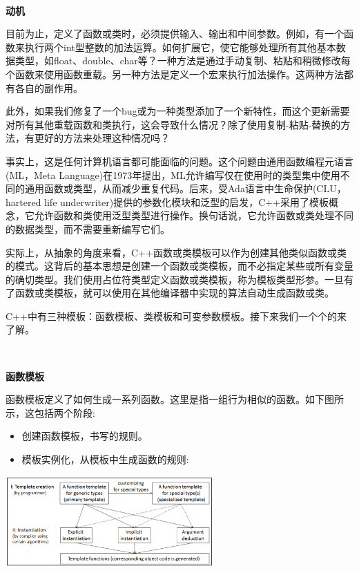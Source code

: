 \noindent\textbf{}\ \par
\textbf{动机} \ \par
目前为止，定义了函数或类时，必须提供输入、输出和中间参数。例如，有一个函数来执行两个int型整数的加法运算。如何扩展它，使它能够处理所有其他基本数据类型，如float、double、char等？一种方法是通过手动复制、粘贴和稍微修改每个函数来使用函数重载。另一种方法是定义一个宏来执行加法操作。这两种方法都有各自的副作用。 \par
此外，如果我们修复了一个bug或为一种类型添加了一个新特性，而这个更新需要对所有其他重载函数和类执行，这会导致什么情况？除了使用复制-粘贴-替换的方法，有更好的方法来处理这种情况吗？ \par
事实上，这是任何计算机语言都可能面临的问题。这个问题由通用函数编程元语言(ML，Meta Language)在1973年提出，ML允许编写仅在使用时的类型集中使用不同的通用函数或类型，从而减少重复代码。后来，受Ada语言中生命保护(CLU，hartered life underwriter)提供的参数化模块和泛型的启发，C++采用了模板概念，它允许函数和类使用泛型类型进行操作。换句话说，它允许函数或类处理不同的数据类型，而不需要重新编写它们。 \par
实际上，从抽象的角度来看，C++函数或类模板可以作为创建其他类似函数或类的模式。这背后的基本思想是创建一个函数或类模板，而不必指定某些或所有变量的确切类型。我们使用占位符类型定义函数或类模板，称为模板类型形参。一旦有了函数或类模板，就可以使用在其他编译器中实现的算法自动生成函数或类。 \par
C++中有三种模板：函数模板、类模板和可变参数模板。接下来我们一个个的来了解。 \par

\noindent\textbf{}\ \par
\textbf{函数模板} \ \par
函数模板定义了如何生成一系列函数。这里是指一组行为相似的函数。如下图所示，这包括两个阶段: \par

\begin{itemize}
	\item 创建函数模板，书写的规则。
	\item 模板实例化，从模板中生成函数的规则:
\end{itemize}

\begin{center}
	\includegraphics[width=0.6\textwidth]{content/Section-1/Chapter-4/1}
\end{center}

